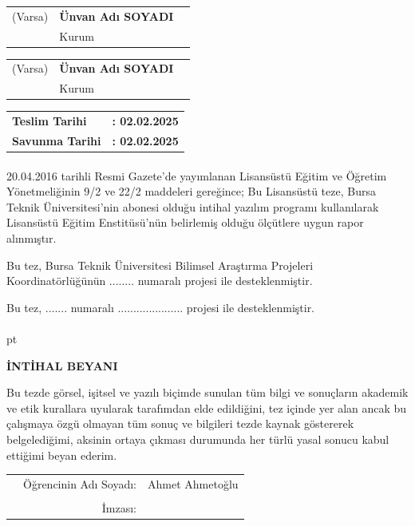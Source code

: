 \documentclass[a4paper,oneside,12pt]{report}
\begin{document}
\vspace{0.6cm}
\begin{tabular}{p{4cm} p{6cm} p{3.5cm}}  
	(Varsa)& \textbf{Ünvan Adı SOYADI} & \dotfill \\
	& Kurum   & \\
\end{tabular}

\vspace{0.6cm}
\begin{tabular}{p{4cm} p{6cm} p{3.5cm}}  
	(Varsa)& \textbf{Ünvan Adı SOYADI} & \dotfill \\
	& Kurum   & \\
\end{tabular}

\vspace{2cm}
\begin{tabular}{p{4cm} p{5.5cm}}  
	\textbf{Teslim Tarihi} & \textbf{: 02.02.2025} \\
	\textbf{Savunma Tarihi} & \textbf{: 02.02.2025} \\
\end{tabular}

\clearpage
\paragraph{}
\vfill
20.04.2016 tarihli Resmi Gazete’de yayımlanan Lisansüstü Eğitim ve Öğretim Yönetmeliğinin 9/2 ve 22/2 maddeleri gereğince; Bu Lisansüstü teze, Bursa Teknik Üniversitesi’nin abonesi olduğu intihal yazılım programı kullanılarak Lisansüstü Eğitim Enstitüsü’nün belirlemiş olduğu ölçütlere uygun rapor alınmıştır.

Bu tez, Bursa Teknik Üniversitesi Bilimsel Araştırma Projeleri Koordinatörlüğünün ........ numaralı projesi ile desteklenmiştir.

Bu tez, ....... numaralı ..................... projesi ile desteklenmiştir.

\clearpage
\paragraph{}
 pt
\begin{center}
	\textbf{İNTİHAL BEYANI}
\end{center}
Bu tezde görsel, işitsel ve yazılı biçimde sunulan tüm bilgi ve sonuçların akademik ve etik kurallara uyularak tarafımdan elde edildiğini, tez içinde yer alan ancak bu çalışmaya özgü olmayan tüm sonuç ve bilgileri tezde kaynak göstererek belgelediğimi, aksinin ortaya çıkması durumunda her türlü yasal sonucu kabul ettiğimi beyan ederim.
\begin{flushright}
	\begin{tabular}{l r r}
		&Öğrencinin Adı Soyadı:& Ahmet Ahmetoğlu \\
		&&\\
		&İmzası:& \\
	\end{tabular}
\end{flushright}
\end{document}
